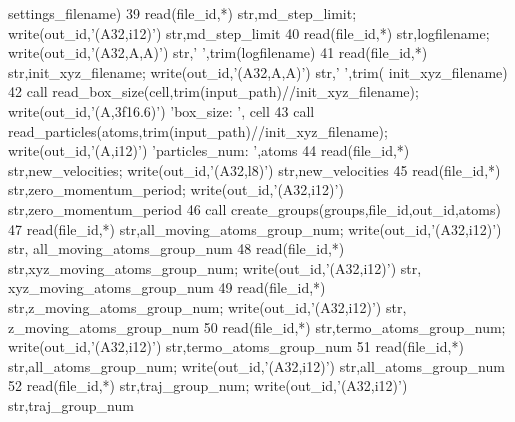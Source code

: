 \begin{DoxyCode}
      settings\_filename)
39 \textcolor{keyword}{read}(file\_id,*) str,md\_step\_limit;                      \textcolor{keyword}{write}(out\_id,\textcolor{stringliteral}{'(A32,i12)'}) str,md\_step\_limit
40 \textcolor{keyword}{read}(file\_id,*) str,logfilename;                        \textcolor{keyword}{write}(out\_id,\textcolor{stringliteral}{'(A32,A,A)'}) str,\textcolor{stringliteral}{' '},trim(logfilename)
41 \textcolor{keyword}{read}(file\_id,*) str,init\_xyz\_filename;                  \textcolor{keyword}{write}(out\_id,\textcolor{stringliteral}{'(A32,A,A)'}) str,\textcolor{stringliteral}{' '},trim(
      init\_xyz\_filename)
42 \textcolor{keyword}{call }read\_box\_size(cell,trim(input\_path)//init\_xyz\_filename);   \textcolor{keyword}{write}(out\_id,\textcolor{stringliteral}{'(A,3f16.6)'})  \textcolor{stringliteral}{'box\_size: '},
      cell%
43 \textcolor{keyword}{call }read\_particles(atoms,trim(input\_path)//init\_xyz\_filename); \textcolor{keyword}{write}(out\_id,\textcolor{stringliteral}{'(A,i12)'})     \textcolor{stringliteral}{'particles\_num:
       '},atoms%
44 \textcolor{keyword}{read}(file\_id,*) str,new\_velocities;                     \textcolor{keyword}{write}(out\_id,\textcolor{stringliteral}{'(A32,l8)'}) str,new\_velocities
45 \textcolor{keyword}{read}(file\_id,*) str,zero\_momentum\_period;               \textcolor{keyword}{write}(out\_id,\textcolor{stringliteral}{'(A32,i12)'}) str,zero\_momentum\_period
46 \textcolor{keyword}{call }create\_groups(groups,file\_id,out\_id,atoms)
47 \textcolor{keyword}{read}(file\_id,*) str,all\_moving\_atoms\_group\_num;         \textcolor{keyword}{write}(out\_id,\textcolor{stringliteral}{'(A32,i12)'}) str,
      all\_moving\_atoms\_group\_num
48 \textcolor{keyword}{read}(file\_id,*) str,xyz\_moving\_atoms\_group\_num;         \textcolor{keyword}{write}(out\_id,\textcolor{stringliteral}{'(A32,i12)'}) str,
      xyz\_moving\_atoms\_group\_num
49 \textcolor{keyword}{read}(file\_id,*) str,z\_moving\_atoms\_group\_num;           \textcolor{keyword}{write}(out\_id,\textcolor{stringliteral}{'(A32,i12)'}) str,
      z\_moving\_atoms\_group\_num
50 \textcolor{keyword}{read}(file\_id,*) str,termo\_atoms\_group\_num;              \textcolor{keyword}{write}(out\_id,\textcolor{stringliteral}{'(A32,i12)'}) str,termo\_atoms\_group\_num
51 \textcolor{keyword}{read}(file\_id,*) str,all\_atoms\_group\_num;                \textcolor{keyword}{write}(out\_id,\textcolor{stringliteral}{'(A32,i12)'}) str,all\_atoms\_group\_num
52 \textcolor{keyword}{read}(file\_id,*) str,traj\_group\_num;                     \textcolor{keyword}{write}(out\_id,\textcolor{stringliteral}{'(A32,i12)'}) str,traj\_group\_num

\end{DoxyCode}
